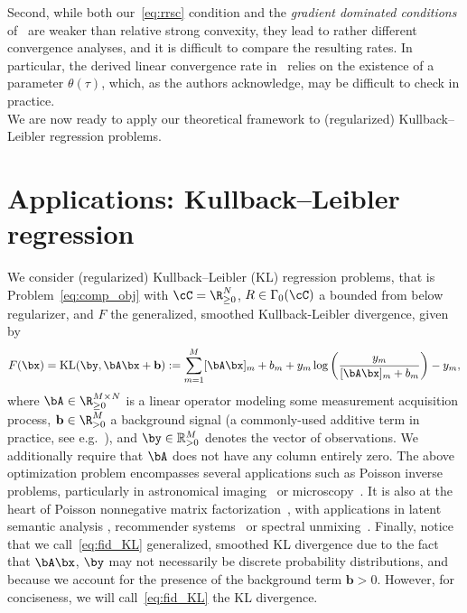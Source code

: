 \documentclass[11pt]{amsart}
\newcommand{\jc}[1]{{\color{red}#1}}
\begin{document}
Second, while both our~\cref{eq:rrsc} condition and the \emph{gradient dominated conditions} of~\cite[Definition 3.2]{Bauschke2019} are weaker than relative strong convexity, they lead to rather different convergence analyses, and it is difficult to compare the resulting rates. In particular, the derived linear convergence rate in~\cite{Bauschke2019}  relies on the existence of a parameter $\theta(\tau)$, which, as the authors acknowledge, may be difficult to check in practice. \\

We are now ready to apply our theoretical framework to (regularized) Kullback--Leibler regression problems.

\section{Applications: Kullback--Leibler regression}\label{sec:KL}
We consider (regularized) Kullback--Leibler (KL) regression problems, that is Problem~\cref{eq:comp_obj} with $\cC=\R^N_{\geq 0}$, $R\in\Gamma_0(\cC)$ a bounded from below regularizer, and $F$ the generalized, smoothed Kullback-Leibler divergence, given by
\begin{equation}\label{eq:fid_KL}
F(\bx)= \mathrm{KL}(\by, \bA\bx+\mathbf{b}) := \sum_{m=1}^M [\bA\bx]_m + b_m + y_m \log \left(\frac{y_m}{[\bA\bx]_m + b_m} \right) - y_m,
\end{equation}
where $\bA\in \R_{\geq 0}^{M \times N}$ is a linear operator modeling some measurement acquisition process, $\mathbf{b}\in \R^M_{> 0}$ a background signal (a commonly-used additive term in practice, see e.g.~\cite{harmany2011spiral}), and $\by\in \mathbb{R}^M_{> 0}$ denotes the vector of observations. We additionally require that $\bA$ does not have any column entirely zero. The above optimization problem encompasses several applications such as Poisson inverse problems, particularly in astronomical imaging~\cite{Bertero2009,Bertero2018} or microscopy~\cite{dey20043d, Zunino_2023}. It is also at the heart of Poisson nonnegative matrix factorization~\cite{LS2000}, with applications in latent semantic analysis \cite{can04}, recommender systems~\cite{gopalan2015scalable} or spectral unmixing~\cite{Fevotte2009}. Finally, notice that we call~\cref{eq:fid_KL} generalized, smoothed KL divergence due to the fact that $\bA\bx$, $\by$ may not necessarily be discrete probability distributions, and because we account for the presence of the background term $\mathbf{b}>0$. However, for conciseness, we will call~\eqref{eq:fid_KL} the KL divergence.
\end{document}
